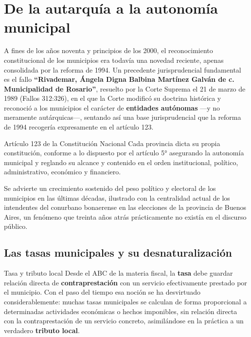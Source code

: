 \documentclass[12pt,oneside]{book}
\begin{document}
\section{De la autarquía a la autonomía municipal}

A fines de los años noventa y principios de los 2000, el reconocimiento constitucional de los municipios era todavía una novedad reciente, apenas consolidada por la reforma de 1994. Un precedente jurisprudencial fundamental es el fallo \textbf{``Rivademar, Ángela Digna Balbina Martínez Galván de c. Municipalidad de Rosario''}, resuelto por la Corte Suprema el 21 de marzo de 1989 (Fallos 312:326), en el que la Corte modificó su doctrina histórica y reconoció a los municipios el carácter de \textbf{entidades autónomas} ---y no meramente autárquicas---, sentando así una base jurisprudencial que la reforma de 1994 recogería expresamente en el artículo 123.

\begin{norma}{Artículo 123 de la Constitución Nacional}
Cada provincia dicta su propia constitución, conforme a lo dispuesto por el artículo 5° asegurando la autonomía municipal y reglando su alcance y contenido en el orden institucional, político, administrativo, económico y financiero.
\end{norma}

Se advierte un crecimiento sostenido del peso político y electoral de los municipios en las últimas décadas, ilustrado con la centralidad actual de los intendentes del conurbano bonaerense en las elecciones de la provincia de Buenos Aires, un fenómeno que treinta años atrás prácticamente no existía en el discurso público.

\subsection{Las tasas municipales y su desnaturalización}

\begin{definition}{Tasa y tributo local}
Desde el ABC de la materia fiscal, la \textbf{tasa} debe guardar relación directa de \textbf{contraprestación} con un servicio efectivamente prestado por el municipio. Con el paso del tiempo esa noción se ha desvirtuado considerablemente: muchas tasas municipales se calculan de forma proporcional a determinadas actividades económicas o hechos imponibles, sin relación directa con la contraprestación de un servicio concreto, asimilándose en la práctica a un verdadero \textbf{tributo local}.
\end{definition}
\end{document}
